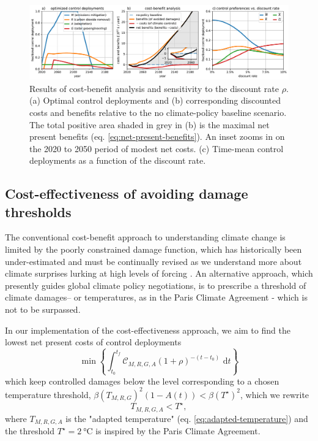 \documentclass[9pt,twocolumn,twoside,lineno]{pnas-new}
\begin{document}
\begin{figure}%
\centering
\includegraphics[width=17.8cm]{figures/default-benefits_controls_and_benefits.pdf}
\caption{Results of cost-benefit analysis and sensitivity to the discount rate $\rho$. (a) Optimal control deployments and (b) corresponding discounted costs and benefits relative to the no climate-policy baseline scenario. The total positive area shaded in grey in (b) is the maximal net present benefits (eq. \ref{eq:net-present-benefits}). An inset zooms in on the 2020 to 2050 period of modest net costs. (c) Time-mean control deployments as a function of the discount rate.}
\label{fig:cost-benefit}
\end{figure}

\subsection*{Cost-effectiveness of avoiding damage thresholds}\label{sec:cost-effectivness}

The conventional cost-benefit approach to understanding climate change is limited by the poorly constrained damage function, which has historically been under-estimated \cite{} and must be continually revised as we understand more about climate surprises lurking at high levels of forcing \citep{alley_abrupt_2003, sherwood_adaptability_2010, scher_carbonocean_2017}. An alternative approach, which presently guides global climate policy negotiations, is to prescribe a threshold of climate damages– or temperatures, as in the Paris Climate Agreement \cite{ParisAgreement2015} - which is not to be surpassed.

In our implementation of the cost-effectiveness approach, we aim to find the lowest net present costs of control deployments
\begin{equation}
    \min\left\{\int_{t_{0}}^{t_{f}} \mathcal{C}_{M,R,G,A} (1 + \rho)^{-(t-t_{0})} \text{ d}t\right\}
\end{equation}
which keep controlled damages below the level corresponding to a chosen temperature threshold,
$\beta (T_{M,R,G})^{2} (1 - A(t)) < \beta (T^{\star})^{2}$, which we rewrite
\begin{equation}
    T_{M,R,G,A} < T^{\star},
\end{equation}
where $T_{M,R,G,A}$ is the "adapted temperature" (eq. \ref{eq:adapted-temperature}) and the threshold $T^{\star} = \SI{2}{\celsius}$ is inspired by the Paris Climate Agreement.
\end{document}
